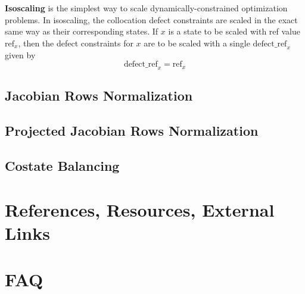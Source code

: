 \documentclass{article}
\begin{document}
\textbf{Isoscaling} is the simplest way to scale dynamically-constrained optimization problems. In isoscaling, the collocation defect constraints are scaled in the exact same way as their corresponding states. If $x$ is a state to be scaled with ref value $\text{ref}_x$, then the defect constraints for $x$ are to be scaled with a single $\text{defect\_ref}_x$ given by
\begin{equation*}
    \text{defect\_ref}_x = \text{ref}_x
\end{equation*}

\subsection*{Jacobian Rows Normalization}

\subsection*{Projected Jacobian Rows Normalization}

\subsection*{Costate Balancing}

\newpage
{}
\section*{References, Resources, External Links}

\newpage
{}
\section*{FAQ}
\end{document}
